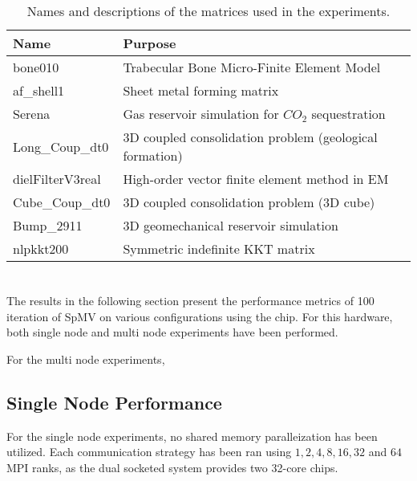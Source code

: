 \begin{table}[H]
\begin{center}
\begin{tabular}[c]{|p{3cm}|p{8.5cm}|}
\hline
\textbf{Name}&\textbf{Purpose}  \\
\hline
bone010&Trabecular Bone Micro-Finite Element Model\\
\hline
af\_shell1&Sheet metal forming matrix\\
\hline
Serena&Gas reservoir simulation for \(CO_{2}\) sequestration\\
\hline
Long\_Coup\_dt0&3D coupled consolidation problem (geological formation)\\
\hline
dielFilterV3real&High-order vector finite element method in EM\\
\hline
Cube\_Coup\_dt0&3D coupled consolidation problem (3D cube)\\
\hline
Bump\_2911&3D geomechanical reservoir simulation\\
\hline
nlpkkt200&Symmetric indefinite KKT matrix\\
\hline
\end{tabular}
\end{center}
\caption{Names and descriptions of the matrices used in the experiments.}
\label{tab:matricesused}
\end{table}

\section{}
The results in the following section present the performance metrics of 100 iteration of SpMV on various configurations using the  chip. For this hardware, both single node and multi node experiments have been performed.
\medskip


For the multi node experiments, 

\subsection{Single Node Performance}
For the single node experiments, no shared memory paralleization has been utilized. Each communication strategy has been ran using \(1,2,4,8,16,32\) and \(64\) MPI ranks, as the dual socketed system provides two 32-core  chips.
\medskip




